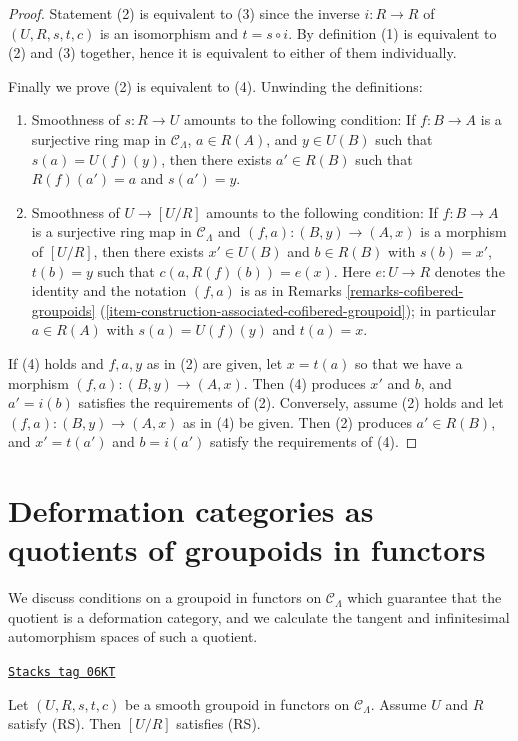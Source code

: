 \begin{proof}
Statement (2) is equivalent to (3) since the inverse $i: R \to R$ of
$(U, R, s, t, c)$ is an isomorphism and $t = s \circ i$. By definition (1) is
equivalent to (2) and (3) together, hence it is equivalent to either of them
individually.

\medskip\noindent
Finally we prove (2) is equivalent to (4). Unwinding the definitions:
\begin{enumerate}
\item[(2)] Smoothness of $s: R \to U$ amounts to the following
condition: If $f: B \to A$ is a surjective ring map in
$\mathcal{C}_\Lambda$, $a \in R(A)$, and $y \in U(B)$ such that
$s(a) = U(f)(y)$, then there exists $a' \in R(B)$ such that
$R(f)(a') = a$ and $s(a') = y$.
\item[(4)] Smoothness of $U \to [U/R]$ amounts to the following
condition: If $f: B \to A$ is a surjective ring map in
$\mathcal{C}_\Lambda$ and $(f, a) : (B, y) \to (A, x)$
is a morphism of $[U/R]$, then there exists $x' \in U(B)$ and
$b \in R(B)$ with $s(b) = x'$, $t(b) = y$
such that $c(a, R(f)(b)) = e(x)$.  Here $e : U \to R$ denotes the
identity and the notation $(f, a)$ is as in Remarks
\ref{remarks-cofibered-groupoids}
(\ref{item-construction-associated-cofibered-groupoid});
in particular $a \in R(A)$ with $s(a) = U(f)(y)$ and $t(a) = x$.
\end{enumerate}
If (4) holds and $f, a, y$ as in (2) are given, let $x = t(a)$ so that
we have a morphism $(f, a): (B, y) \to (A, x)$.
Then (4) produces $x'$ and $b$, and $a' = i(b)$ satisfies the requirements
of (2). Conversely, assume (2) holds and let $(f, a): (B, y) \to (A, x)$
as in (4) be given. Then (2) produces $a' \in R(B)$, and $x' = t(a')$ and
$b = i(a')$ satisfy the requirements of (4).
\end{proof}

\section{Deformation categories as quotients of groupoids in functors}
\label{formal-defos-section-deformation-categories-as-quotients}
We discuss conditions on a groupoid in functors on $\mathcal{C}_\Lambda$ which
guarantee that the quotient is a deformation category, and we calculate the
tangent and infinitesimal automorphism spaces of such a quotient.

\begin{lemma}
\label{formal-defos-lemma-smooth-RS-groupoid-in-functors-quotient}
\href{https://stacks.math.columbia.edu/tag/06KT}{\texttt{Stacks tag 06KT}}

Let $(U, R, s, t, c)$ be a smooth groupoid in functors on $\mathcal{C}_\Lambda$.
Assume $U$ and $R$ satisfy (RS). Then $[U/R]$ satisfies (RS).
\end{lemma}

